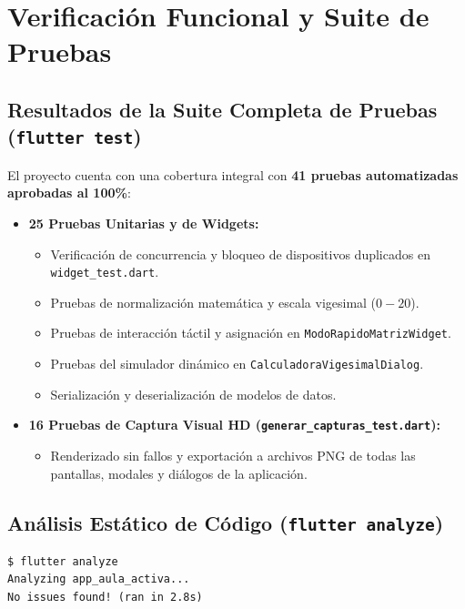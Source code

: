 \documentclass[12pt,a4paper]{article}
\begin{document}
\section{Verificación Funcional y Suite de Pruebas}

\subsection{Resultados de la Suite Completa de Pruebas (\texttt{flutter test})}
El proyecto cuenta con una cobertura integral con \textbf{41 pruebas automatizadas aprobadas al 100\%}:
\begin{itemize}
    \item \textbf{25 Pruebas Unitarias y de Widgets:}
    \begin{itemize}[noitemsep]
        \item Verificación de concurrencia y bloqueo de dispositivos duplicados en \texttt{widget\_test.dart}.
        \item Pruebas de normalización matemática y escala vigesimal ($0-20$).
        \item Pruebas de interacción táctil y asignación en \texttt{ModoRapidoMatrizWidget}.
        \item Pruebas del simulador dinámico en \texttt{CalculadoraVigesimalDialog}.
        \item Serialización y deserialización de modelos de datos.
    \end{itemize}
    \item \textbf{16 Pruebas de Captura Visual HD (\texttt{generar\_capturas\_test.dart}):}
    \begin{itemize}[noitemsep]
        \item Renderizado sin fallos y exportación a archivos PNG de todas las pantallas, modales y diálogos de la aplicación.
    \end{itemize}
\end{itemize}

\subsection{Análisis Estático de Código (\texttt{flutter analyze})}
\begin{verbatim}
$ flutter analyze
Analyzing app_aula_activa...
No issues found! (ran in 2.8s)
\end{verbatim}
\end{document}
